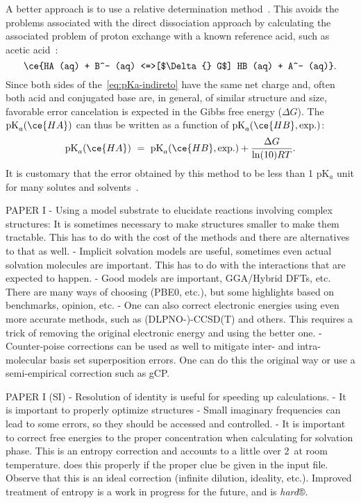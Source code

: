 A better approach is to use a relative determination method~\cite{Ding_2009}.
This avoids the problems associated with the direct dissociation approach
by calculating the associated problem of proton exchange with a known reference
acid,
such as acetic acid~\cite{Goldberg_2002}:
%
\begin{equation}
	\ce{HA (aq) + B^- (aq) <=>[$\Delta{} G$] HB (aq) + A^- (aq)}\text{.}
	\label{eq:pKa-indireto}
\end{equation}
%
Since both sides of the~\cref{eq:pKa-indireto}
have the same net charge and,
often both acid and conjugated base are,
in
general,
of similar structure and size,
favorable error cancelation is expected
in the Gibbs free energy ($\Delta G$).
The $\text{pK}_a(\ce{HA})$
can thus be written as a function of $\text{pK}_a(\ce{HB},
	\text{exp.})$:
%
\begin{equation}
	\text{pK}_a(\ce{HA})~=~\text{pK}_a(\ce{HB},
	\text{exp.}) + \frac{\Delta G}{\ln(10) R T}\text{.}
\end{equation}
%
It is customary that the error obtained by this method to be less than 1 pK$_a$
unit for many solutes and solvents~\cite{Ding_2009}.

\clearpage


PAPER I
- Using a model substrate to elucidate reactions involving complex structures:
It is sometimes necessary to make structures smaller to make them tractable.
This has to do with the cost of the methods and there are alternatives to that as well.
- Implicit solvation models are useful,
sometimes even actual solvation molecules are important.
This has to do with the interactions that are expected to happen.
- Good models are important,
GGA/Hybrid DFTs,
etc.
There are many ways of choosing (PBE0,
etc.),
but some highlights based on benchmarks,
opinion,
etc.
- One can also correct electronic energies using even more accurate methods,
such as (DLPNO-)-CCSD(T) and others.
This requires a trick of removing the original electronic energy and using the better one.
- Counter-poise corrections can be used as well to mitigate inter- and intra-molecular basis set superposition errors.
One can do this the original way or use a semi-empirical correction such as gCP.\@

PAPER I (SI)
- Resolution of identity is useful for speeding up calculations.
- It is important to properly optimize structures
- Small imaginary frequencies can lead to some errors,
so they should be accessed and controlled.
- It is important to correct free energies to the proper
concentration when calculating for solvation phase.
This is an entropy correction and accounts to
a little over 2~\kcalmol at room temperature.
\overreact{} does this properly if the proper clue be
given in the input file.
Observe that this is an ideal correction (infinite dilution,
ideality,
etc.).
Improved treatment of entropy is a work in progress for the future,
and is \emph{hard}®.


